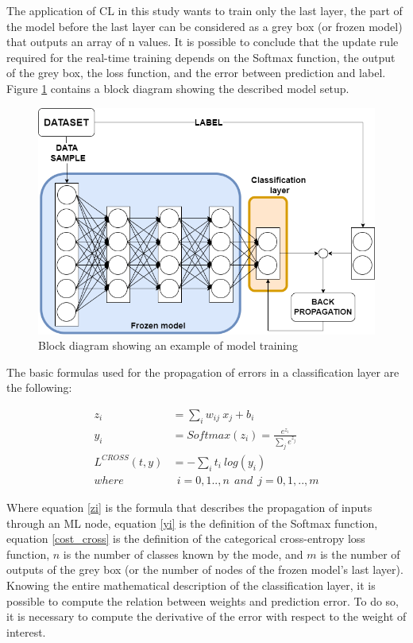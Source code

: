 \documentclass[12pt]{report}
\begin{document}
The application of CL in this study wants to train only the last layer, the part of the  model before the last layer can be considered as a grey box (or frozen model) that outputs an array of n values. It is possible to conclude that the update rule required for the real-time training depends on the Softmax function, the output of the grey box, the loss function, and the error between prediction and label. Figure \ref{fig:block_diag_esempio} contains a block diagram showing the described model setup. \\

\begin{figure}[h!]
    \centering
    \includegraphics[width=120mm]{Figures/Chapter3/basicsystem.png} 
    \caption{Block diagram showing an example of model training}
    \label{fig:block_diag_esempio}    
\end{figure}

The basic formulas used for the propagation of errors in a classification layer are the following:

\begin{align} 
	z_i &= \sum_i w_{ij} \: x_j + b_i \label{zi} \\ 
	y_i &= Softmax(z_i) = \frac{e^{z_i}}{\sum_j e^{z_j}} 	\label{yi} \\
	L^{CROSS} (t, y) &= - \sum_i t_i \: log(y_i) \label{cost_cross} \\
	where & \: \: i= 0,1..,n  \: \: and \: \:  j=0,1,..,m \nonumber 
\end{align}

Where equation \ref{zi} is the formula that describes the propagation of inputs through an ML node, equation \ref{yi} is the definition of the Softmax function, equation \ref{cost_cross} is the definition of the categorical cross-entropy loss function, $n$ is the number of classes known by the mode, and $m$ is the number of outputs of the grey box (or the number of nodes of the frozen model's last layer).\\
Knowing the entire mathematical description of the classification layer, it is possible to compute the relation between weights and prediction error. To do so, it is necessary to compute the derivative of the error with respect to the weight of interest. 
\end{document}
